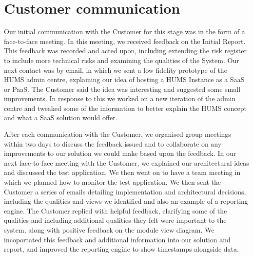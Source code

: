 \section{Customer communication}
\label{sec:communication}

Our initial communication with the Customer for this stage was in the form of a face-to-face meeting. In this meeting, we received feedback on the Initial Report. This feedback was recorded and acted upon, including extending the risk register to include more technical risks and examining the qualities of the System. Our next contact was by email, in which we sent a low fidelity prototype of the HUMS admin centre, explaining our idea of hosting a HUMS Instance as a SaaS or PaaS. The Customer said the idea was interesting and suggested some small improvements. In response to this we worked on a new iteration of the admin centre and tweaked some of the information to better explain the HUMS concept and what a SaaS solution would offer.

After each communication with the Customer, we organised group meetings within two days to discuss the feedback issued and to collaborate on any improvements to our solution we could make based upon the feedback. In our next face-to-face meeting with the Customer, we explained our architectural ideas and discussed the test application. We then went on to have a team meeting in which we planned how to monitor the test application. We then sent the Customer a series of emails detailing implementation and architectural decisions, including the qualities and views we identified and also an example of a reporting engine. The Customer replied with helpful feedback, clarifying some of the qualities and including additional qualities they felt were important to the system, along with positive feedback on the module view diagram. We incoportated this feedback and additional information into our solution and report, and improved the reporting engine to show timestamps alongside data.
